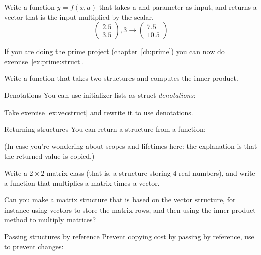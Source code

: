 \begin{exercise}
  \label{ex:vecstruct-scale}
  Write a function $y=f(x,a)$ that takes a  and
   parameter as input, and returns a vector that is the
  input multiplied by the scalar.
  \[ \begin{pmatrix}2.5\\3.5\end{pmatrix},3 \rightarrow
    \begin{pmatrix}7.5\\10.5\end{pmatrix} \]
\end{exercise}

\begin{exercise}
  \label{ex:primestruct}
  If you are doing the prime project (chapter~\ref{ch:prime}) you can
  now do exercise~\ref{ex:prime:struct}.
\end{exercise}

\begin{exercise}
  \label{ex:vecstruct}
  Write a function  that takes two 
  structures and computes the inner product.
\end{exercise}

\begin{block}{Denotations}
  \label{sl:struct-denote}
  You can use initializer lists as struct
  \emph{denotations}:
\end{block}

\begin{exercise}
  \label{ex:struct-denote}
  Take exercise \ref{ex:vecstruct} and rewrite it to use denotations.
\end{exercise}

\begin{block}{Returning structures}
  \label{sl:struct-return}
  You can return a structure from a function:

  (In case you're wondering about scopes and lifetimes here: the
  explanation is that the returned value is copied.)
\end{block}

\begin{exercise}
  \label{ex:matstruct}
  Write a $2\times 2$ matrix class (that is, a structure storing 4
  real numbers), and write a function 
  that multiplies a matrix times a vector.

  Can you make a matrix structure that is based on the vector
  structure, for instance using vectors to store the matrix rows, and
  then using the inner product method to multiply matrices?
\end{exercise}

\begin{block}{Passing structures by reference}
  \label{sl:struct-passref}
  Prevent copying cost by passing by reference, use  to
  prevent changes:
\end{block}



